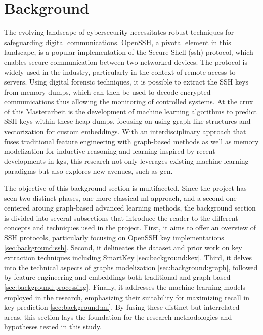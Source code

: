 \chapter{Background}\label{sec:background}


The evolving landscape of cybersecurity necessitates robust techniques for safeguarding digital communications. OpenSSH, a pivotal element in this landscape, is a popular implementation of the Secure Shell (\acrshort{ssh}) protocol, which enables secure communication between two networked devices. The protocol is widely used in the industry, particularly in the context of remote access to servers. Using digital forensic techniques, it is possible to extract the SSH keys from memory dumps, which can then be used to decode encrypted communications thus allowing the monitoring of controlled systems. At the crux of this Masterarbeit is the development of machine learning algorithms to predict SSH keys within these heap dumps, focusing on using graph-like-structures and vectorization for custom embeddings. With an interdisciplinary approach that fuses traditional feature engineering with graph-based methods as well as memory modelization for inductive reasoning and learning inspired by recent developments in \acrfull{kg}s, this research not only leverages existing machine learning paradigms but also explores new avenues, such as \acrfull{gcn}.

The objective of this background section is multifaceted. Since the project has seen two distinct phases, one more classical \acrfull{ml} approach, and a second one centered aroung graph-based advanced learning methods, the background section is divided into several subsections that introduce the reader to the different concepts and techniques used in the project. First, it aims to offer an overview of SSH protocols, particularly focusing on OpenSSH key implementations \autoref{sec:background:ssh}. Second, it delineates the dataset and prior work on key extraction techniques including SmartKey \autoref{sec:background:kex}. Third, it delves into the technical aspects of graphs modelization \autoref{sec:background:graph}, followed by feature engineering and embeddings both traditional and graph-based \autoref{sec:background:processing}. Finally, it addresses the machine learning models employed in the research, emphasizing their suitability for maximizing recall in key prediction \autoref{sec:background:ml}. By fusing these distinct but interrelated areas, this section lays the foundation for the research methodologies and hypotheses tested in this study.

